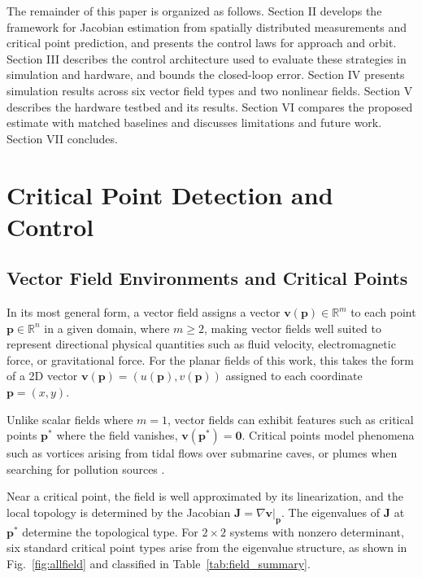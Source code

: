 \documentclass[lettersize,journal]{IEEEtran}
\begin{document}
The remainder of this paper is organized as follows. Section II develops the framework for Jacobian estimation from spatially distributed measurements and critical point prediction, and presents the control laws for approach and orbit. Section III describes the control architecture used to evaluate these strategies in simulation and hardware, and bounds the closed-loop error. Section IV presents simulation results across six vector field types and two nonlinear fields. Section V describes the hardware testbed and its results. Section VI compares the proposed estimate with matched baselines and discusses limitations and future work. Section VII concludes.


\section{Critical Point Detection and Control}

\subsection{Vector Field Environments and Critical Points}

In its most general form, a vector field assigns a vector $\mathbf{v}(\mathbf{p}) \in \mathbb{R}^m$ to each point $\mathbf{p} \in \mathbb{R}^n$ in a given domain, where $m \geq 2$, making vector fields well suited to represent directional physical quantities such as fluid velocity, electromagnetic force, or gravitational force. For the planar fields of this work, this takes the form of a 2D vector $\mathbf{v}(\mathbf{p}) = (u(\mathbf{p}), v(\mathbf{p}))$ assigned to each coordinate $\mathbf{p} = (x, y)$.

Unlike scalar fields where $m=1$, vector fields can exhibit features such as critical points $\mathbf{p}^*$ where the field vanishes, $\mathbf{v}(\mathbf{p}^*) = \mathbf{0}$. Critical points model phenomena such as vortices arising from tidal flows over submarine caves, or plumes when searching for pollution sources \cite{49}.

Near a critical point, the field is well approximated by its linearization, and the local topology is determined by the Jacobian $\mathbf{J} = \nabla\mathbf{v}|_{\mathbf{p}}$. The eigenvalues of $\mathbf{J}$ at $\mathbf{p}^*$ determine the topological type. For $2 \times 2$ systems with nonzero determinant, six standard critical point types arise from the eigenvalue structure, as shown in Fig.~\ref{fig:allfield} and classified in Table~\ref{tab:field_summary}.
\end{document}
